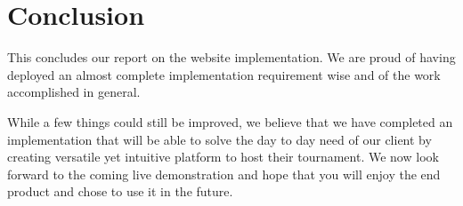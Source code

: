 \section{Conclusion}
\label{sec:Conclusion}


This concludes our report on the website implementation. We are proud of having deployed
an almost complete implementation requirement wise and of the work accomplished in general.

While a few things could still be improved, we believe that we have completed an implementation that will be able to solve the day to day need of our client by creating
versatile yet intuitive platform to host their tournament. We now look forward to the
coming live demonstration and hope that you will enjoy the end product and chose to use
it in the future.